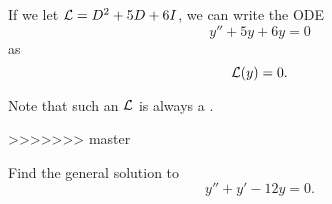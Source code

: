 \begin{applicationActivities}
\begin{observation}
If we let \(\mathcal{L}=D^2+5D+6I\), we can write the ODE \[y''+5y+6y=0\] as \[\mathcal{L}(y)=0.\]

Note that such an \(\mathcal{L}\) is always a .
\end{observation}
>>>>>>> master

\begin{activity}{5}
Find the general solution to
\[y''+y'-12y=0.\]
\end{activity}



\end{applicationActivities}
